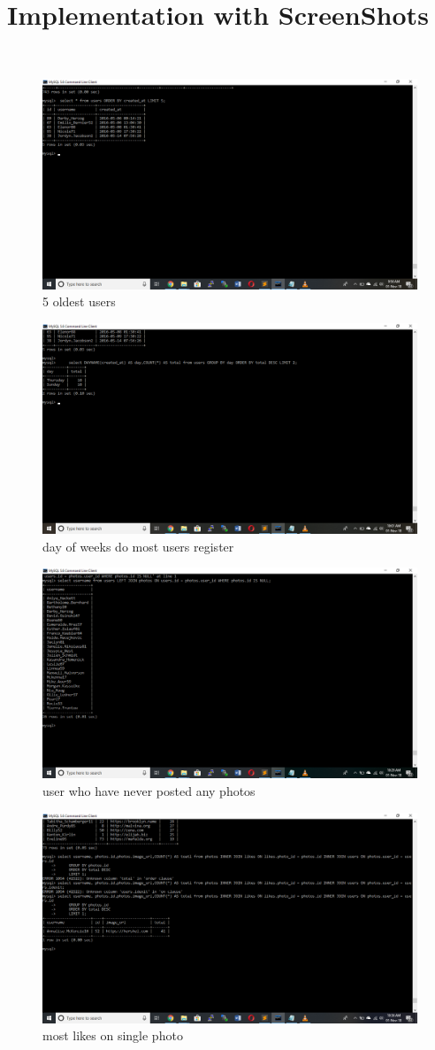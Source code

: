 \section{Implementation with ScreenShots}
\\
\begin{figure}[h!]
	\centering
	\includegraphics[width=0.75\linewidth]{sc1.png}
	\caption{5 oldest users}
\end{figure}
\begin{figure}[h!]
	\centering
	\includegraphics[width=0.75\linewidth]{sc2.png}
	\caption{day of weeks do most users register}
\end{figure}
\begin{figure}[h!]
	\centering
	\includegraphics[width=0.75\linewidth]{sc3.png}
	\caption{user who have never posted any photos}
\end{figure}
\begin{figure}[h!]
	\centering
	\includegraphics[width=0.75\linewidth]{sc4.png}
	\caption{most likes on single photo}
	
\end{figure}
